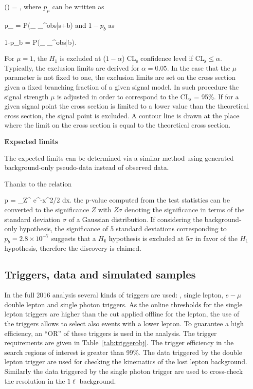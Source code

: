{
(\mu) = ,
}
where $p_{\mu}$ can be written as

{
p_{\mu} = P(_{\mu} \geq {}_{\mu}^{obs}|s+b)
}
and $1-p_{b}$ as

{
1-p_{b} = P(_{\mu} \geq {}_{\mu}^{obs}|b).
}

For $\mu=1$, the $H_{1}$ is excluded at ($1-\alpha$) $\mathrm{CL_{s}}$ confidence level if $\mathrm{CL_{s}} \leq \alpha$. Typically, the exclusion limits are derived for $\alpha = 0.05$. In the case that the $\mu$ parameter is not fixed to one, the exclusion limits are set on the cross section given a fixed branching fraction of a given signal model. In such procedure the signal strength $\mu$ is adjusted in order to correspond to the $\mathrm{CL_{s}}$ = 95\%. If for a given signal point the cross section is limited to a lower value than the theoretical cross section, the signal point is excluded. A contour line is drawn at the place where the limit on the cross section is equal to the theoretical cross section.

\textbf{Expected limits}

The expected limits can be determined via a similar method using generated background-only pseudo-data instead of observed data. 

Thanks to the relation  

{
 p = \int_Z^{\infty}  e^{-x^{2}/2} dx.
}
the p-value computed from the test statistics can be converted to the significance $Z$ with $Z\sigma$ denoting the significance in terms of the standard deviation $\sigma$ of a Gaussian distribution. If considering the background-only hypothesis, the significance of 5 standard deviations corresponding to $p_{b} = 2.8 \times 10^{-7} $ suggests that a $H_{0}$ hypothesis is excluded at $5 \sigma$ in favor of the $H_{1}$ hypothesis, therefore the discovery is claimed. %


\subsection{Triggers, data and simulated samples~\label{sec:trigger}}

In the full 2016 analysis several kinds of triggers are used:  \MET, single lepton, $e-\mu$ double lepton  and single photon triggers. As the online thresholds for the single lepton triggers are higher than the cut applied offline for the lepton, the use of the \MET triggers allows to select also events with a lower \pt lepton. To guarantee a high efficiency,  an ``OR'' of these triggers is used in the analysis. The trigger requirements are given in Table~\ref{tab:triggerobj}. The trigger efficiency in the search regions of interest is greater than 99\%. The data triggered by the double lepton trigger are used for checking the kinematics of the lost lepton background. Similarly the data triggered by the single photon trigger are used to cross-check the \MET resolution in  the $1\ell$ background. 

